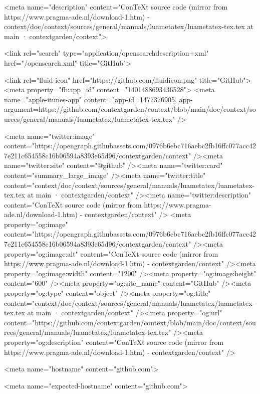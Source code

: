     

      <meta name="description" content="ConTeXt source code (mirror from https://www.pragma-ade.nl/download-1.htm) - context/doc/context/sources/general/manuals/luametatex/luametatex-tex.tex at main · contextgarden/context">

      <link rel="search" type="application/opensearchdescription+xml" href="/opensearch.xml" title="GitHub">

    <link rel="fluid-icon" href="https://github.com/fluidicon.png" title="GitHub">
    <meta property="fb:app_id" content="1401488693436528">
    <meta name="apple-itunes-app" content="app-id=1477376905, app-argument=https://github.com/contextgarden/context/blob/main/doc/context/sources/general/manuals/luametatex/luametatex-tex.tex" />

      <meta name="twitter:image" content="https://opengraph.githubassets.com/0976b6ebc716aebc2fb16ffc077acc427e211c654558c16b06594a8393e65d96/contextgarden/context" /><meta name="twitter:site" content="@github" /><meta name="twitter:card" content="summary_large_image" /><meta name="twitter:title" content="context/doc/context/sources/general/manuals/luametatex/luametatex-tex.tex at main · contextgarden/context" /><meta name="twitter:description" content="ConTeXt source code (mirror from https://www.pragma-ade.nl/download-1.htm) - contextgarden/context" />
  <meta property="og:image" content="https://opengraph.githubassets.com/0976b6ebc716aebc2fb16ffc077acc427e211c654558c16b06594a8393e65d96/contextgarden/context" /><meta property="og:image:alt" content="ConTeXt source code (mirror from https://www.pragma-ade.nl/download-1.htm) - contextgarden/context" /><meta property="og:image:width" content="1200" /><meta property="og:image:height" content="600" /><meta property="og:site_name" content="GitHub" /><meta property="og:type" content="object" /><meta property="og:title" content="context/doc/context/sources/general/manuals/luametatex/luametatex-tex.tex at main · contextgarden/context" /><meta property="og:url" content="https://github.com/contextgarden/context/blob/main/doc/context/sources/general/manuals/luametatex/luametatex-tex.tex" /><meta property="og:description" content="ConTeXt source code (mirror from https://www.pragma-ade.nl/download-1.htm) - contextgarden/context" />
  




      <meta name="hostname" content="github.com">



        <meta name="expected-hostname" content="github.com">


